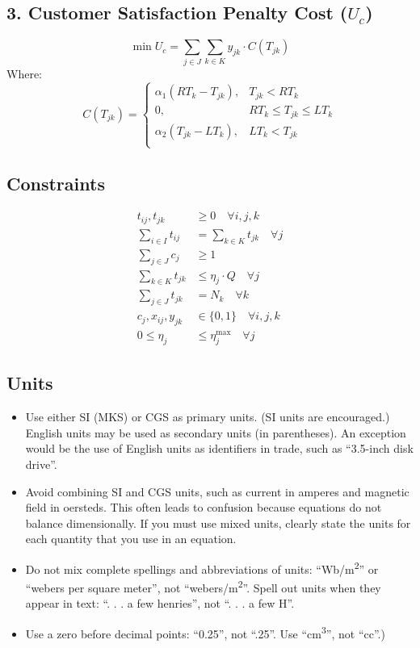 \documentclass[conference]{IEEEtran}
\begin{document}
\subsection*{3. Customer Satisfaction Penalty Cost ($U_c$)}
\[
\min U_c = \sum_{j \in J} \sum_{k \in K} y_{jk} \cdot C(T_{jk})
\]
Where:
\[
C(T_{jk}) =
\begin{cases}
\alpha_1 (RT_k - T_{jk}), & T_{jk} < RT_k \\
0, & RT_k \leq T_{jk} \leq LT_k \\
\alpha_2 (T_{jk} - LT_k), & LT_k < T_{jk} \\
\end{cases}
\]

\subsection*{Constraints}
\begin{align}
t_{ij}, t_{jk} &\geq 0 \quad \forall i,j,k \\
\sum_{i \in I} t_{ij} &= \sum_{k \in K} t_{jk} \quad \forall j \\
\sum_{j \in J} c_j &\geq 1 \\
\sum_{k \in K} t_{jk} &\leq \eta_j \cdot Q \quad \forall j \\
\sum_{j \in J} t_{jk} &= N_k \quad \forall k \\
c_j, x_{ij}, y_{jk} &\in \{0, 1\} \quad \forall i,j,k \\
0 \leq \eta_j &\leq \eta_j^{\max} \quad \forall j
\end{align}
\subsection{Units}
\begin{itemize}
\item Use either SI (MKS) or CGS as primary units. (SI units are encouraged.) English units may be used as secondary units (in parentheses). An exception would be the use of English units as identifiers in trade, such as ``3.5-inch disk drive''.
\item Avoid combining SI and CGS units, such as current in amperes and magnetic field in oersteds. This often leads to confusion because equations do not balance dimensionally. If you must use mixed units, clearly state the units for each quantity that you use in an equation.
\item Do not mix complete spellings and abbreviations of units: ``Wb/m\textsuperscript{2}'' or ``webers per square meter'', not ``webers/m\textsuperscript{2}''. Spell out units when they appear in text: ``. . . a few henries'', not ``. . . a few H''.
\item Use a zero before decimal points: ``0.25'', not ``.25''. Use ``cm\textsuperscript{3}'', not ``cc''.)
\end{itemize}
\end{document}
